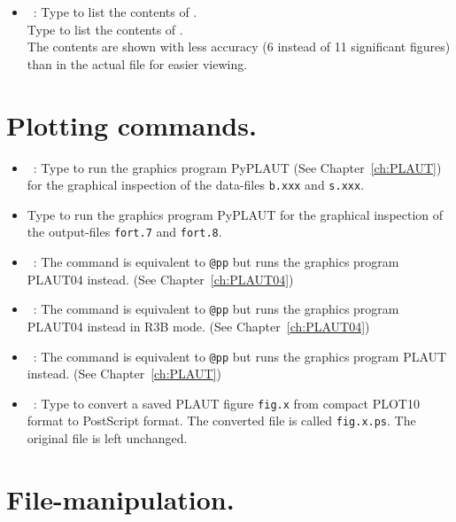 \documentclass[12pt]{report}
\begin{document}
\begin{itemize}
\item[\tt @lbf]~:
  Type  to list the contents of .\\
  Type  to list the contents of .\\
  The contents are shown with less accuracy (6 instead of 11
  significant figures) than in the actual file for easier viewing.


\end{itemize}

\section{ Plotting commands.} 

\begin{itemize}

\item[\tt @pp]~:
  Type  to run the graphics program {\cal PyPLAUT}
  (See Chapter~\ref{ch:PLAUT})
  for the graphical inspection of the data-files 
  {\tt b.xxx} and {\tt s.xxx}. 
\item[-]
  Type  to run the graphics program {\cal PyPLAUT}
  for the graphical inspection of the output-files 
  {\tt fort.7} and {\tt fort.8}.

\item[\tt @pl]~:
  The command  is equivalent to {\tt @pp} but runs
  the graphics program {\cal PLAUT04} instead.
  (See Chapter~\ref{ch:PLAUT04})

\item[\tt @r3b]~:
  The command  is equivalent to {\tt @pp} but runs
  the graphics program {\cal PLAUT04} instead in R3B mode.
  (See Chapter~\ref{ch:PLAUT04})

\item[\tt @p]~:
  The command  is equivalent to {\tt @pp} but runs
  the graphics program {\cal PLAUT} instead.
  (See Chapter~\ref{ch:PLAUT})

\item[\tt @ps]~:
  Type  to convert a saved {\cal PLAUT} figure {\tt fig.x}
  from compact {\cal PLOT10} format to {\cal PostScript} format.
  The converted file is called {\tt fig.x.ps}. 
  The original file is left unchanged.

\end{itemize}

\section{ File-manipulation.} 
\end{document}
